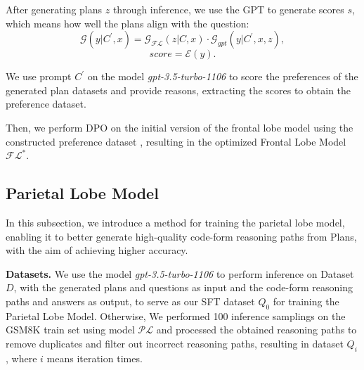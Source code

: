 \documentclass[11pt]{article}
\begin{document}

After generating plans $z$ through inference, we use the GPT to generate scores $s$, which means how well the plans align with the question:
\begin{equation}
    \mathcal{G}(y|C^{'},x) = \mathcal{G}_{\mathcal{FL}}(z|C,x) \cdot \mathcal{G}_{gpt}(y|C^{'},x,z),
\end{equation}
\begin{equation}
    score = \mathcal{E}(y).
\end{equation}


We use prompt $C^{'}$ on the model \textit{gpt-3.5-turbo-1106} to score the preferences of the generated plan datasets and provide reasons, extracting the scores to obtain the preference dataset.


Then, we perform DPO on the initial version of the frontal lobe model using the constructed preference dataset , resulting in the optimized Frontal Lobe Model $\mathcal{FL}^{*}$.

\subsection{Parietal Lobe Model}
\label{subsec:3.4}

In this subsection, we introduce a method for training the parietal lobe model, enabling it to better generate high-quality code-form reasoning paths from Plans, with the aim of achieving higher accuracy.

\textbf{Datasets.} We use the model \textit{gpt-3.5-turbo-1106} to perform inference on Dataset $D$, with the generated plans and questions as input and the code-form reasoning paths and answers as output, to serve as our SFT dataset $Q_0$ for training the Parietal Lobe Model. Otherwise, We performed 100 inference samplings on the GSM8K train set using model $\mathcal{PL}$ and processed the obtained reasoning paths to remove duplicates and filter out incorrect reasoning paths, resulting in dataset $Q_i$, where $i$ means iteration times.
\end{document}
